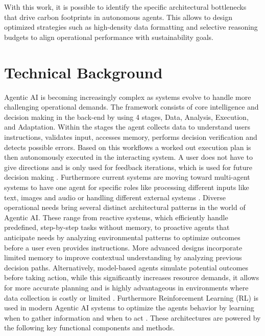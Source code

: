 \documentclass[10pt,twocolumn,letterpaper]{article}
\begin{document}
\\\\
With this work, it is possible to identify the specific architectural bottlenecks that drive carbon footprints in autonomous agents. This allows to design optimized strategies such as high-density data formatting and selective reasoning budgets to align operational performance with sustainability goals.

\section{Technical Background}
Agentic AI is becoming increasingly complex as systems evolve to handle more challenging  operational demands. The framework consists of core intelligence and decision making in the back-end by using 4 stages, Data, Analysis, Execution, and Adaptation. Within the stages the agent collects data to understand users instructions, validates input, accesses memory, performs decision verification and detects possible errors. Based on this workflows a worked out execution plan is then autonomously executed in the interacting system. A user does not have to give directions and is only used for feedback iterations, which is used for future decision making \citep{Nisa_Shirazi_Saip_Pozi_2025}. Furthermore current systems are moving toward multi-agent systems to have one agent for specific roles like processing different inputs like text, images and audio or handling different external systems \citep{Acharya_Kuppan_Divya_2025, Nisa_Shirazi_Saip_Pozi_2025}. Diverse operational needs bring several distinct architectural patterns in the world of Agentic AI. These range from reactive systems, which efficiently handle predefined, step-by-step tasks without memory, to proactive agents that anticipate needs by analyzing environmental patterns to optimize outcomes before a user even provides instructions. More advanced designs incorporate limited memory to improve contextual understanding by analyzing previous decision paths. Alternatively, model-based agents simulate potential outcomes before taking action, while this significantly increases resource demands, it allows for more accurate planning and is highly advantageous in environments where data collection is costly or limited \citep{Nisa_Shirazi_Saip_Pozi_2025}. Furthermore Reinforcement Learning (RL) is used in modern Agentic AI systems to optimize the agents behavior by learning when to gather information and when to act \citep{Xu_2026, Acharya_Kuppan_Divya_2025}. These architectures are powered by the following key functional components and methods.
\end{document}
